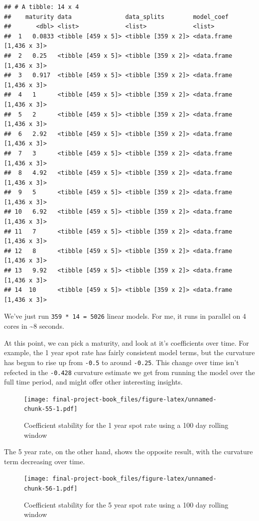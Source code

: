 \documentclass[]{book}
\theoremstyle{definition}
\theoremstyle{definition}
\theoremstyle{definition}
\theoremstyle{remark}
\begin{document}
\begin{verbatim}
## # A tibble: 14 x 4
##    maturity data               data_splits        model_coef              
##       <dbl> <list>             <list>             <list>                  
##  1   0.0833 <tibble [459 x 5]> <tibble [359 x 2]> <data.frame [1,436 x 3]>
##  2   0.25   <tibble [459 x 5]> <tibble [359 x 2]> <data.frame [1,436 x 3]>
##  3   0.917  <tibble [459 x 5]> <tibble [359 x 2]> <data.frame [1,436 x 3]>
##  4   1      <tibble [459 x 5]> <tibble [359 x 2]> <data.frame [1,436 x 3]>
##  5   2      <tibble [459 x 5]> <tibble [359 x 2]> <data.frame [1,436 x 3]>
##  6   2.92   <tibble [459 x 5]> <tibble [359 x 2]> <data.frame [1,436 x 3]>
##  7   3      <tibble [459 x 5]> <tibble [359 x 2]> <data.frame [1,436 x 3]>
##  8   4.92   <tibble [459 x 5]> <tibble [359 x 2]> <data.frame [1,436 x 3]>
##  9   5      <tibble [459 x 5]> <tibble [359 x 2]> <data.frame [1,436 x 3]>
## 10   6.92   <tibble [459 x 5]> <tibble [359 x 2]> <data.frame [1,436 x 3]>
## 11   7      <tibble [459 x 5]> <tibble [359 x 2]> <data.frame [1,436 x 3]>
## 12   8      <tibble [459 x 5]> <tibble [359 x 2]> <data.frame [1,436 x 3]>
## 13   9.92   <tibble [459 x 5]> <tibble [359 x 2]> <data.frame [1,436 x 3]>
## 14  10      <tibble [459 x 5]> <tibble [359 x 2]> <data.frame [1,436 x 3]>
\end{verbatim}

We've just run \texttt{359\ *\ 14\ =\ 5026} linear models. For me, it
runs in parallel on 4 cores in \textasciitilde{}8 seconds.

At this point, we can pick a maturity, and look at it's coefficients
over time. For example, the 1 year spot rate has fairly consistent model
terms, but the curvature has begun to rise up from \texttt{-0.5} to
around \texttt{-0.25}. This change over time isn't refected in the
\texttt{-0.428} curvature estimate we get from running the model over
the full time period, and might offer other interesting insights.

\begin{figure}
\centering
\texttt{[image: final-project-book\_files/figure-latex/unnamed-chunk-55-1.pdf]}
\caption{\label{fig:unnamed-chunk-55}Coefficient stability for the 1 year
spot rate using a 100 day rolling window}
\end{figure}

The 5 year rate, on the other hand, shows the opposite result, with the
curvature term decreasing over time.

\begin{figure}
\centering
\texttt{[image: final-project-book\_files/figure-latex/unnamed-chunk-56-1.pdf]}
\caption{\label{fig:unnamed-chunk-56}Coefficient stability for the 5 year
spot rate using a 100 day rolling window}
\end{figure}
\end{document}
